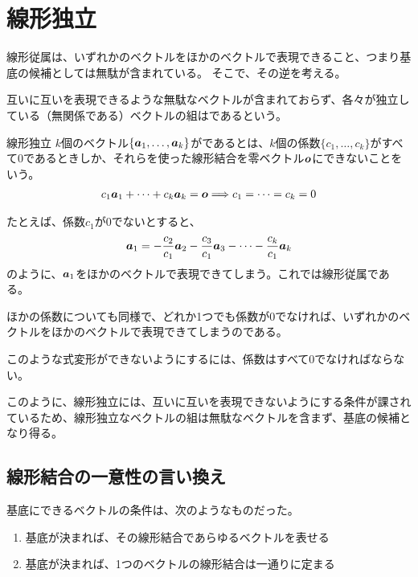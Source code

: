 \documentclass[../../../topic_linear-algebra]{subfiles}
\begin{document}
\sectionline
\section{線形独立}

線形従属は、いずれかのベクトルをほかのベクトルで表現できること、つまり基底の候補としては無駄が含まれている。
そこで、その逆を考える。

\br

互いに互いを表現できるような無駄なベクトルが含まれておらず、各々が独立している（無関係である）ベクトルの組はであるという。

\begin{definition}{線形独立}
  $k$個のベクトル$\{ \vb*{a}_1, \ldots, \vb*{a}_k \}$がであるとは、$k$個の係数$\{c_1, \ldots, c_k\}$がすべて$0$であるときしか、それらを使った線形結合を零ベクトル$\vb*{o}$にできないことをいう。
  \begin{gather*}
    c_1 \vb*{a}_1 + \cdots + c_k\vb*{a}_{k} = \vb*{o} \Longrightarrow c_1 = \cdots = c_k = 0
  \end{gather*}
\end{definition}

たとえば、係数$c_1$が$0$でないとすると、
\begin{equation*}
  \vb*{a}_1 = -\frac{c_2}{c_1} \vb*{a}_2 - \frac{c_3}{c_1} \vb*{a}_3 - \cdots - \frac{c_k}{c_1} \vb*{a}_{k}
\end{equation*}
のように、$\vb*{a}_1$をほかのベクトルで表現できてしまう。これでは線形従属である。

ほかの係数についても同様で、どれか1つでも係数が$0$でなければ、いずれかのベクトルをほかのベクトルで表現できてしまうのである。

このような式変形ができないようにするには、係数はすべて$0$でなければならない。

\br

このように、線形独立には、互いに互いを表現できないようにする条件が課されているため、線形独立なベクトルの組は無駄なベクトルを含まず、基底の候補となり得る。

\subsection{線形結合の一意性の言い換え}

基底にできるベクトルの条件は、次のようなものだった。

\begin{enumerate}[label=\romanlabel]
  \item 基底が決まれば、その線形結合であらゆるベクトルを表せる
  \item 基底が決まれば、1つのベクトルの線形結合は一通りに定まる
\end{enumerate}
\end{document}
